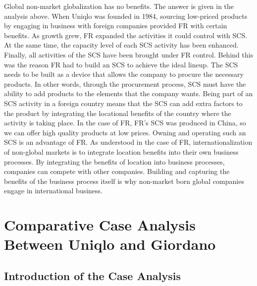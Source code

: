 \documentclass[12pt,a4paper]{article}
\begin{document}
Global non-market globalization has no benefits. The answer is given in
the analysis above. When Uniqlo was founded in 1984, sourcing low-priced
products by engaging in business with foreign companies provided FR with
certain benefits. As growth grew, FR expanded the activities it could
control with SCS. At the same time, the capacity level of each SCS
activity has been enhanced. Finally, all activities of the SCS have been
brought under FR control. Behind this was the reason FR had to build an
SCS to achieve the ideal lineup. The SCS needs to be built as a device
that allows the company to procure the necessary products. In other
words, through the procurement process, SCS must have the ability to add
products to the elements that the company wants. Being part of an SCS
activity in a foreign country means that the SCS can add extra factors
to the product by integrating the locational benefits of the country
where the activity is taking place. In the case of FR, FR's SCS was
produced in China, so we can offer high quality products at low prices.
Owning and operating such an SCS is an advantage of FR. As understood in
the case of FR, internationalization of non-global markets is to
integrate location benefits into their own business processes. By
integrating the benefits of location into business processes, companies
can compete with other companies. Building and capturing the benefits of
the business process itself is why non-market born global companies
engage in international business.

\hypertarget{comparative-case-analysis-between-uniqlo-and-giordano}{%
\section{Comparative Case Analysis Between Uniqlo and
Giordano}\label{comparative-case-analysis-between-uniqlo-and-giordano}}

\hypertarget{introduction-of-the-case-analysis}{%
\subsection{Introduction of the Case
Analysis}\label{introduction-of-the-case-analysis}}
\end{document}

